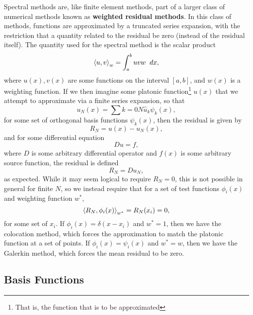 Spectral methods are, like finite element methods, part of a larger class of numerical methods known as {\bf weighted residual methods}. In this class of methods, functions are approximated by a truncated series expansion, with the restriction that a quantity related to the residual be zero (instead of the residual itself). The quantity used for the spectral method is the scalar product 
\begin{equation}\label{eq:scalarProduct}
\scprod{u}{v}{w} = \int{a}{b}{uvw}{dx},
\end{equation}
where  $u(x),v(x)$ are some functions on the interval $[a,b]$, and $w(x)$ is a weighting function. If we then imagine some platonic function\footnote{That is, the function that is to be approximated} $u(x)$ that we attempt to approximate via a finite series expansion, so that
\begin{equation}\label{eq:seriesExpansion}
u_N(x) = \sum{k=0}{N}{\hat{u}_k \psi_k(x)},
\end{equation}
for some set of orthogonal basis functions $\psi_k(x)$, then the residual is given by
\begin{equation}
R_N = u(x)-u_N(x),
\end{equation} 
and for some differential equation
\begin{equation}
Du = f,
\end{equation}
where $D$ is some arbitrary differential operator and $f(x)$ is some arbitrary source function, the residual is defined
\begin{equation}
R_N = Du_N,
\end{equation}
as expected. While it may seem logical to require $R_N = 0$, this is not possible in general for finite $N$, so we instead require that for a set of test functions $\phi_i(x)$ and weighting function $w^*$, 
\begin{equation}\label{eq:SpectralZero}
\left < R_N,\phi_i(x) \right >_{w^*} = R_N(x_i) = 0,
\end{equation}
for some set of $x_i$. If $\phi_i(x) = \delta(x-x_i)$ and $w^* = 1$, then we have the colocation method, which forces the approximation to match the platonic function at a set of points. If $\phi_i(x) = \psi_i(x)$ and $w^* = w$, then we have the Galerkin method, which forces the mean residual to be zero. 

\subsection{Basis Functions}

